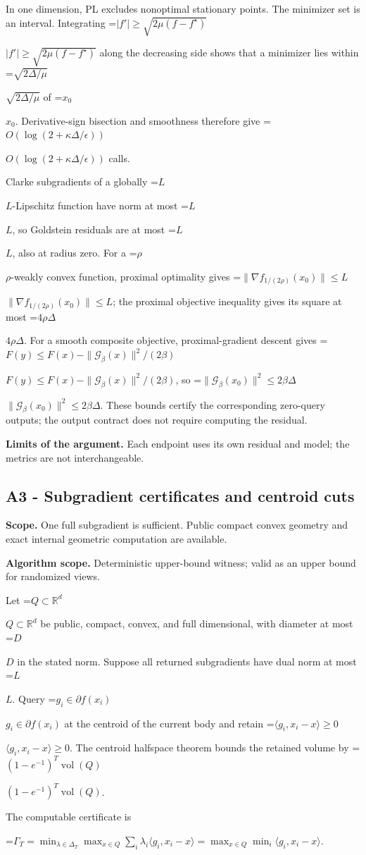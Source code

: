 \documentclass[10pt,a4paper]{article}
\newcommand{\AtlasMath}[1]{\par\begingroup\centering\setbox0=\hbox{$\displaystyle #1$}\ifdim\wd0>1.4\linewidth\typeout{ATLAS WIDE FORMULA: \the\wd0}\fi\ifdim\wd0>\linewidth\resizebox{\linewidth}{!}{\box0}\else\box0\fi\par\endgroup}
\newcommand{\AtlasInlineMath}[1]{\begingroup\setbox0=\hbox{$#1$}\ifdim\wd0>.4\linewidth\endgroup\AtlasMath{#1}\else\endgroup$#1$\fi}
\begin{document}
In one dimension, PL excludes nonoptimal stationary points. The minimizer set is an interval. Integrating
\AtlasInlineMath{|f'|\ge\sqrt{2\mu(f-f^\star)}}
along the decreasing side shows that a minimizer lies within \AtlasInlineMath{\sqrt{2\Delta/\mu}} of \AtlasInlineMath{x_0}. Derivative-sign bisection and smoothness therefore give \AtlasInlineMath{O(\log(2+\kappa\Delta/\epsilon))} calls.

Clarke subgradients of a globally \AtlasInlineMath{L}-Lipschitz function have norm at most \AtlasInlineMath{L}, so Goldstein residuals are at most \AtlasInlineMath{L}, also at radius zero. For a \AtlasInlineMath{\rho}-weakly convex function, proximal optimality gives
\AtlasInlineMath{\|\nabla f_{1/(2\rho)}(x_0)\|\le L}; the proximal objective inequality gives its square at most \AtlasInlineMath{4\rho\Delta}.
For a smooth composite objective, proximal-gradient descent gives
\AtlasInlineMath{F(y)\le F(x)-\|\mathcal G_\beta(x)\|^2/(2\beta)},
so \AtlasInlineMath{\|\mathcal G_\beta(x_0)\|^2\le2\beta\Delta}.
These bounds certify the corresponding zero-query outputs; the output contract does not require computing the residual.

\textbf{Limits of the argument.} Each endpoint uses its own residual and model; the metrics are not interchangeable.

\subsection{A3 - Subgradient certificates and centroid cuts}
\textbf{Scope.} One full subgradient is sufficient. Public compact convex geometry and exact internal geometric computation are available.

\textbf{Algorithm scope.} Deterministic upper-bound witness; valid as an upper bound for randomized views.

Let \AtlasInlineMath{Q\subset\mathbb R^d} be public, compact, convex, and full dimensional, with diameter at most \AtlasInlineMath{D} in the stated norm. Suppose all returned subgradients have dual norm at most \AtlasInlineMath{L}. Query \AtlasInlineMath{g_i\in\partial f(x_i)} at the centroid of the current body and retain \AtlasInlineMath{\langle g_i,x_i-x\rangle\ge0}. The centroid halfspace theorem bounds the retained volume by \AtlasInlineMath{(1-e^{-1})^T\operatorname{vol}(Q)}.

The computable certificate is

\AtlasMath{\Gamma_T=\min_{\lambda\in\Delta_T}\max_{x\in Q}\sum_i\lambda_i\langle g_i,x_i-x\rangle
=\max_{x\in Q}\min_i\langle g_i,x_i-x\rangle.}
\end{document}
